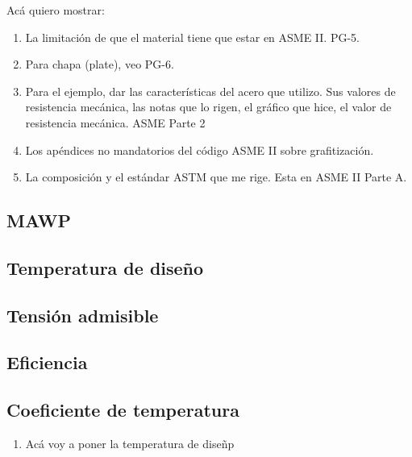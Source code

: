 Acá quiero mostrar:

\begin{enumerate}
     \item La limitación de que el material tiene que estar en ASME II. PG-5.
     \item Para chapa (plate), veo PG-6.
     \item Para el ejemplo, dar las características del acero que utilizo. Sus valores de resistencia mecánica, las notas que lo rigen, el gráfico que hice, el valor de resistencia mecánica. ASME Parte 2
     \item Los apéndices no mandatorios del código ASME II sobre grafitización.
     \item La composición y el estándar ASTM que me rige. Esta en ASME II Parte A.
\end{enumerate}

\subsection{MAWP}

\subsection{Temperatura de diseño}

\subsection{Tensión admisible}

\subsection{Eficiencia}

\subsection{Coeficiente de temperatura}

\begin{enumerate}
     \item Acá voy a poner la temperatura de diseñp
\end{enumerate}













